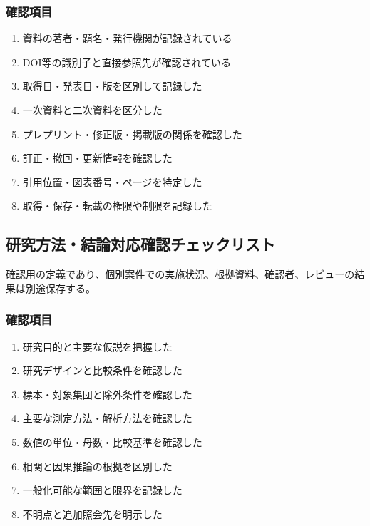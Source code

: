 \documentclass[a4paper,11pt]{article}
\begin{document}
\subsubsection*{確認項目}
\begin{enumerate}[leftmargin=2em,itemsep=0.3em]
\item 資料の著者・題名・発行機関が記録されている\par
\item DOI等の識別子と直接参照先が確認されている\par
\item 取得日・発表日・版を区別して記録した\par
\item 一次資料と二次資料を区分した\par
\item プレプリント・修正版・掲載版の関係を確認した\par
\item 訂正・撤回・更新情報を確認した\par
\item 引用位置・図表番号・ページを特定した\par
\item 取得・保存・転載の権限や制限を記録した\par
\end{enumerate}
\subsection{研究方法・結論対応確認チェックリスト}
\par 確認用の定義であり、個別案件での実施状況、根拠資料、確認者、レビューの結果は別途保存する。\par\medskip
\subsubsection*{確認項目}
\begin{enumerate}[leftmargin=2em,itemsep=0.3em]
\item 研究目的と主要な仮説を把握した\par
\item 研究デザインと比較条件を確認した\par
\item 標本・対象集団と除外条件を確認した\par
\item 主要な測定方法・解析方法を確認した\par
\item 数値の単位・母数・比較基準を確認した\par
\item 相関と因果推論の根拠を区別した\par
\item 一般化可能な範囲と限界を記録した\par
\item 不明点と追加照会先を明示した\par
\end{enumerate}
\end{document}
